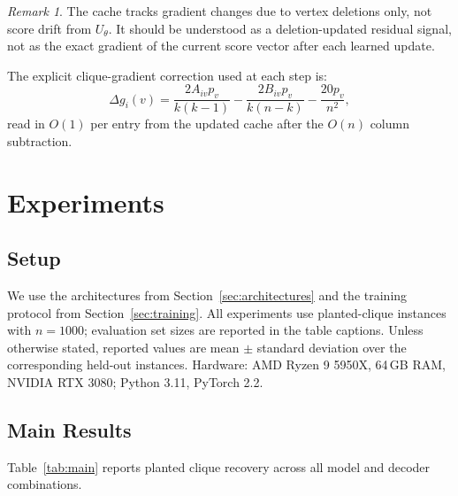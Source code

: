 \documentclass[11pt]{article}
\theoremstyle{plain}
\theoremstyle{remark}
\newtheorem{remark}[theorem]{Remark}
\begin{document}
\begin{remark}
  The cache tracks gradient changes due to vertex deletions only, not score drift
  from $U_\theta$. It should be understood as a deletion-updated residual signal,
  not as the exact gradient of the current score vector after each learned update.
\end{remark}

The explicit clique-gradient correction used at each step is:
\begin{equation}
  \label{eq:clique_correction}
  \Delta g_i(v)
  =
  \frac{2A_{iv}p_v}{k(k-1)}
  -
  \frac{2B_{iv}p_v}{k(n-k)}
  -
  \frac{20p_v}{n^2},
\end{equation}
read in $O(1)$ per entry from the updated cache after the $O(n)$ column subtraction.




\section{Experiments}
\label{sec:experiments}

\subsection{Setup}
We use the architectures from Section~\ref{sec:architectures} and the training
protocol from Section~\ref{sec:training}. All experiments use planted-clique
instances with $n=1000$; evaluation set sizes are reported in the table captions.
Unless otherwise stated, reported values are mean $\pm$ standard deviation over
the corresponding held-out instances. Hardware: AMD Ryzen 9 5950X, 64\,GB RAM, NVIDIA RTX 3080;
Python 3.11, PyTorch 2.2.

\subsection{Main Results}
\label{sec:main_results}

Table~\ref{tab:main} reports planted clique recovery across all model and decoder
combinations.
\end{document}
